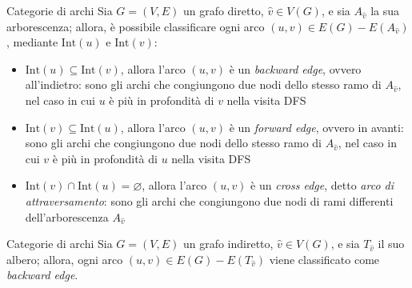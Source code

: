 \documentclass[a4paper, 12pt]{report}
\begin{document}
    \begin{framedobs}{Categorie di archi}
        Sia $G= (V, E)$ un grafo diretto, $\hat v \in V(G)$, e sia $A_{\hat v}$ la sua arborescenza; allora, è possibile classificare ogni arco $(u, v) \in E(G) - E(A_{\hat v})$, mediante $\mathrm{Int}(u)$ e $\mathrm{Int}(v)$:
        \begin{itemize}
            \item $\mathrm{Int}(u) \subseteq \mathrm{Int}(v)$, allora l'arco $(u, v)$ è un \textit{backward edge}, ovvero all'indietro: sono gli archi che congiungono due nodi dello stesso ramo di $A_{\hat v}$, nel caso in cui $u$ è più in profondità di $v$ nella visita DFS 
            \item $\mathrm{Int}(v) \subseteq \mathrm{Int}(u)$, allora l'arco $(u, v)$ è un \textit{forward edge}, ovvero in avanti: sono gli archi che congiungono due nodi dello stesso ramo di $A_{\hat v}$, nel caso in cui $v$ è più in profondità di $u$ nella visita DFS
            \item $\mathrm{Int}(v) \cap \mathrm{Int}(u) = \varnothing$, allora l'arco $(u, v)$ è un \textit{cross edge}, detto \textit{arco di attraversamento}: sono gli archi che congiungono due nodi di rami differenti dell'arborescenza $A_{\hat v}$
        \end{itemize}
    \end{framedobs}

    \begin{framedobs}{Categorie di archi}
        Sia $G=(V, E)$ un grafo indiretto, $\hat v \in V(G)$, e sia $T_{\hat v}$ il suo albero; allora, ogni arco $(u, v) \in E(G) - E(T_{\hat v})$ viene classificato come \textit{backward edge}.
    \end{framedobs}
\end{document}
